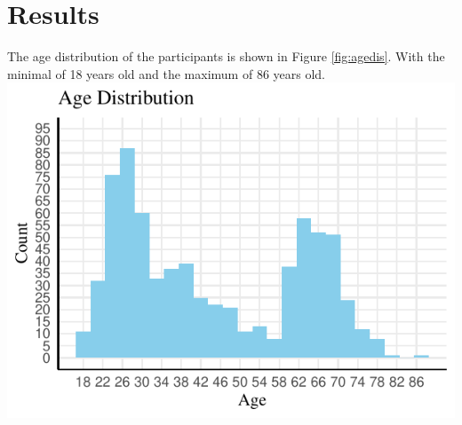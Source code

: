 \documentclass[
  man,floatsintext]{apa6}
\begin{document}
\hypertarget{results}{%
\section{Results}\label{results}}

The age distribution of the participants is shown in Figure \ref{fig:agedis}. With the minimal of 18 years old and the maximum of 86 years old.
\includegraphics{x_files/figure-latex/agedis-1.pdf}
\end{document}
